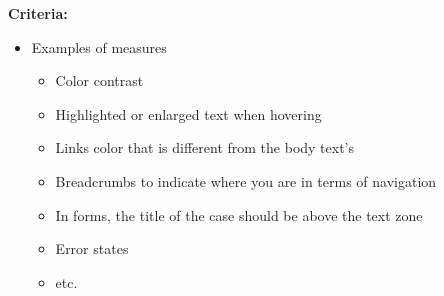 \textbf{Criteria:}

\begin{itemize}
\item Examples of measures
\begin{itemize}
\item Color contrast
\item Highlighted or enlarged text when hovering
\item Links color that is different from the body text's
\item Breadcrumbs to indicate where you are in terms of navigation
\item In forms, the title of the case should be above the text zone
\item Error states
\item etc.
\end{itemize}
\end{itemize}

